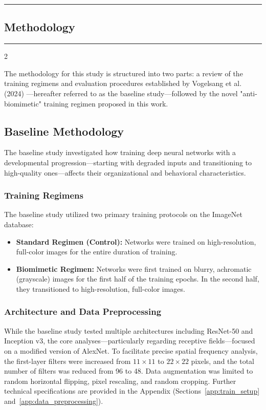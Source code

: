 {\color{gray}\hrule}
\begin{center}
\section{Methodology}
\bigskip
\end{center}
{\color{gray}\hrule}
\begin{multicols}{2}

The methodology for this study is structured into two parts: a review of the training regimens and evaluation procedures established by Vogelsang et al. (2024)\cite{vogelsang2024a} —hereafter referred to as the baseline study—followed by the novel "anti-biomimetic" training regimen proposed in this work.

\subsection{Baseline Methodology}
The baseline study investigated how training deep neural networks with a developmental progression—starting with degraded inputs and transitioning to high-quality ones—affects their organizational and behavioral characteristics.

\subsubsection{Training Regimens}
The baseline study utilized two primary training protocols on the ImageNet database\cite{deng2009imagenet}:
\begin{itemize}
    \item \textbf{Standard Regimen (Control):} Networks were trained on high-resolution, full-color images for the entire duration of training.
    \item \textbf{Biomimetic Regimen:} Networks were first trained on blurry, achromatic (grayscale) images for the first half of the training epochs. In the second half, they transitioned to high-resolution, full-color images.
    
\end{itemize}

\subsubsection{Architecture and Data Preprocessing}
While the baseline study tested multiple architectures including ResNet-50\cite{resnet} and Inception v3\cite{inceptionv3}, the core analyses—particularly regarding receptive fields—focused on a modified version of AlexNet. To facilitate precise spatial frequency analysis, the first-layer filters were increased from $11 \times 11$ to $22 \times 22$ pixels, and the total number of filters was reduced from 96 to 48. Data augmentation was limited to random horizontal flipping, pixel rescaling, and random cropping. Further technical specifications are provided in the Appendix (Sections~\ref{app:train_setup} and~\ref{app:data_preprocessing}).




\end{multicols}
